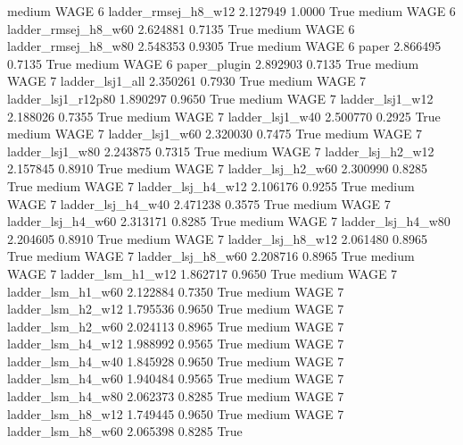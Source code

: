     medium     WAGE                 6    ladder_rmsej_h8_w12   2.127949      1.0000    True
    medium     WAGE                 6    ladder_rmsej_h8_w60   2.624881      0.7135    True
    medium     WAGE                 6    ladder_rmsej_h8_w80   2.548353      0.9305    True
    medium     WAGE                 6                  paper   2.866495      0.7135    True
    medium     WAGE                 6           paper_plugin   2.892903      0.7135    True
    medium     WAGE                 7        ladder_lsj1_all   2.350261      0.7930    True
    medium     WAGE                 7     ladder_lsj1_r12p80   1.890297      0.9650    True
    medium     WAGE                 7        ladder_lsj1_w12   2.188026      0.7355    True
    medium     WAGE                 7        ladder_lsj1_w40   2.500770      0.2925    True
    medium     WAGE                 7        ladder_lsj1_w60   2.320030      0.7475    True
    medium     WAGE                 7        ladder_lsj1_w80   2.243875      0.7315    True
    medium     WAGE                 7      ladder_lsj_h2_w12   2.157845      0.8910    True
    medium     WAGE                 7      ladder_lsj_h2_w60   2.300990      0.8285    True
    medium     WAGE                 7      ladder_lsj_h4_w12   2.106176      0.9255    True
    medium     WAGE                 7      ladder_lsj_h4_w40   2.471238      0.3575    True
    medium     WAGE                 7      ladder_lsj_h4_w60   2.313171      0.8285    True
    medium     WAGE                 7      ladder_lsj_h4_w80   2.204605      0.8910    True
    medium     WAGE                 7      ladder_lsj_h8_w12   2.061480      0.8965    True
    medium     WAGE                 7      ladder_lsj_h8_w60   2.208716      0.8965    True
    medium     WAGE                 7      ladder_lsm_h1_w12   1.862717      0.9650    True
    medium     WAGE                 7      ladder_lsm_h1_w60   2.122884      0.7350    True
    medium     WAGE                 7      ladder_lsm_h2_w12   1.795536      0.9650    True
    medium     WAGE                 7      ladder_lsm_h2_w60   2.024113      0.8965    True
    medium     WAGE                 7      ladder_lsm_h4_w12   1.988992      0.9565    True
    medium     WAGE                 7      ladder_lsm_h4_w40   1.845928      0.9650    True
    medium     WAGE                 7      ladder_lsm_h4_w60   1.940484      0.9565    True
    medium     WAGE                 7      ladder_lsm_h4_w80   2.062373      0.8285    True
    medium     WAGE                 7      ladder_lsm_h8_w12   1.749445      0.9650    True
    medium     WAGE                 7      ladder_lsm_h8_w60   2.065398      0.8285    True
